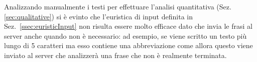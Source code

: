 Analizzando manualmente i testi per effettuare l'analisi quantitativa (Sez. \ref{sec:qualitative}) si è evinto che l'euristica di input definita in Sez.~\ref{ssec:euristicInput} non risulta essere molto efficace dato che invia le frasi al server anche quando non è necessario: ad esempio, se viene scritto un testo più lungo di 5 caratteri ma esso contiene una abbreviazione come  allora questo viene inviato al server che analizzerà una frase che non è realmente terminata.